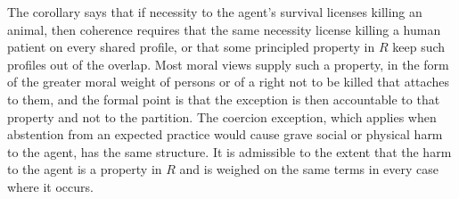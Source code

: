\documentclass[11pt]{article}
\theoremstyle{definition}
\theoremstyle{plain}
\theoremstyle{definition}
\newcommand{\Rel}{R}
\begin{document}
The corollary says that if necessity to the agent's survival licenses killing an animal, then coherence requires that the same necessity license killing a human patient on every shared profile, or that some principled property in $\Rel$ keep such profiles out of the overlap. Most moral views supply such a property, in the form of the greater moral weight of persons or of a right not to be killed that attaches to them, and the formal point is that the exception is then accountable to that property and not to the partition. The coercion exception, which applies when abstention from an expected practice would cause grave social or physical harm to the agent, has the same structure. It is admissible to the extent that the harm to the agent is a property in $\Rel$ and is weighed on the same terms in every case where it occurs.
\end{document}
